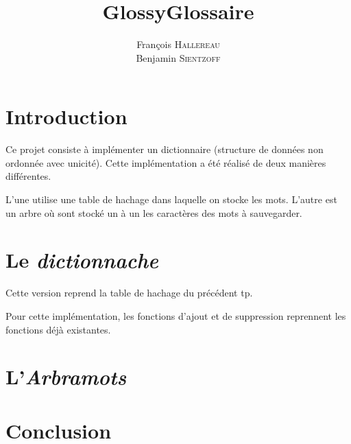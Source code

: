 \documentclass[12pt,a4paper,final]{article}
\author{François \textsc{Hallereau} \\ Benjamin \textsc{Sientzoff}}
\title{GlossyGlossaire}
\begin{document}
\maketitle

\vspace{5cm}

\tableofcontents

\newpage

\section*{Introduction}
Ce projet consiste à implémenter un dictionnaire (structure de données non ordonnée avec unicité). Cette implémentation a été réalisé de deux manières différentes. 

L'une utilise une table de hachage dans laquelle on stocke les mots. L'autre est un arbre où sont stocké un à un les caractères des mots à sauvegarder.

\section{Le \emph{dictionnache}}
Cette version reprend la table de hachage du précédent tp.

Pour cette implémentation, les fonctions d'ajout et de suppression reprennent les fonctions déjà existantes.
 


\section{L'\emph{Arbramots}}

\section*{Conclusion}
\end{document}
